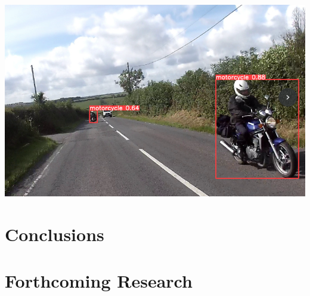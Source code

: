\documentclass[a0,portrait]{a0poster}
\begin{document}
\begin{multicols}{2}
\begin{center}
\begin{minipage}{0.15\textwidth}
				\centering
				\includegraphics[width=\linewidth]{motorcycle.png}
				\label{fig:lateClassificationP2}
			\end{minipage}\vspace{1cm}
		\end{center}\vspace{1cm}


	\color{DarkRed} %

	\section*{Conclusions}


	\color{DarkSlateGray} %


	\section*{Forthcoming Research}



\end{multicols}
\end{document}
